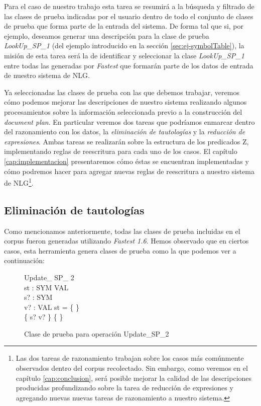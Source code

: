 Para el caso de nuestro trabajo esta tarea se resumirá a la búsqueda y filtrado de las clases de prueba indicadas por el usuario dentro de todo el conjunto de clases de prueba que forma parte de la entrada del sistema. De forma tal que si, por ejemplo, deseamos generar una descripción para la clase de prueba \emph{LookUp\_SP\_1} (del ejemplo introducido en la sección \ref{sec:ej-symbolTable}), la misión de esta tarea será la de identificar y seleccionar la clase \emph{LookUp\_SP\_1} entre todas las generadas por \emph{Fastest} que formarán parte de los datos de entrada de nuestro sistema de NLG.


Ya seleccionadas las clases de prueba con las que debemos trabajar, veremos cómo podemos mejorar las descripciones de nuestro sistema realizando algunos procesamientos sobre la información seleccionada previo a la construcción del \textit{document plan}. En particular veremos dos tareas que podríamos enmarcar dentro del razonamiento con los datos, la \emph{eliminación de tautologías} y la \emph{reducción de expresiones}. Ambas tareas se realizarán sobre la estructura de los predicados Z, implementando reglas de reescritura para cada uno de los casos. El capítulo \ref{cap:implementacion} presentaremos cómo éstas se encuentran implementadas y cómo podremos hacer para agregar nuevas reglas de reescritura a nuestro sistema de NLG\footnote{Las dos tareas de razonamiento trabajan sobre los casos más comúnmente observados dentro del corpus recolectado. Sin embargo, como veremos en el capítulo \ref{cap:conclusion}, será posible mejorar la calidad de las descripciones producidas profundizando sobre la tarea de reducción de expresiones y agregando nuevas nuevas tareas de razonamiento a nuestro sistema.}.

\subsection*{Eliminación de tautologías}
Como mencionamos anteriormente, todas las clases de prueba incluidas en el corpus fueron generadas utilizando \emph{Fastest 1.6}. Hemos observado que en ciertos casos, esta herramienta genera clases de prueba como la que podemos ver a continuación:

\begin{figure}[H]
  \centering
\begin{schema}{Update\_ SP\_ 2}\\
 st : SYM \pfun VAL \\
 s? : SYM \\
 v? : VAL 
\where
 st = \{ \} \\
 \{ s? \mapsto v? \} \neq \{ \}
\end{schema}
  \caption{Clase de prueba para operación Update\_SP\_2}
  \label{fig:ej_update_sp_2}
\end{figure}

